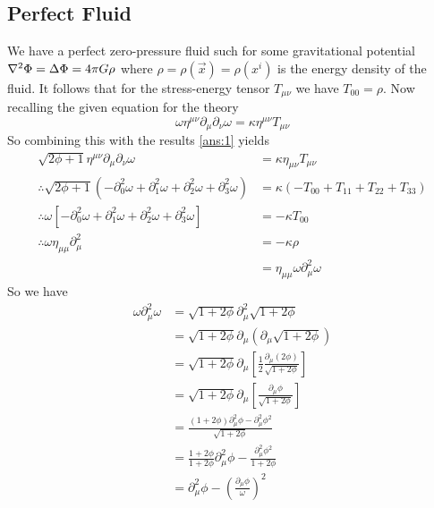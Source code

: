 \documentclass{article}
\begin{document}
	\subsection{Perfect Fluid}
	We have a perfect zero-pressure fluid such for some gravitational potential $\nabla^2 \Phi = \Delta \Phi = 4\pi G\rho$ where $\rho = \rho(\vec{x}) = \rho(x^i)$ is the energy density of the fluid. It follows that for the stress-energy tensor $T_{\mu\nu}$ we have $T_00 = \rho$. Now recalling the given equation for the theory
	\begin{equation}
		\label{eq:theory}
		\omega \eta^{\mu\nu} \partial_\mu \partial_\nu \omega = \kappa \eta^{\mu\nu} T_{\mu\nu}
	\end{equation}
	So combining this with the results \ref{ans:1} yields
	\begin{align*}
		\sqrt{2 \phi + 1} \eta^{\mu\nu} \partial_\mu \partial_\nu \omega &= \kappa \eta_{\mu\nu} T_{\mu\nu} \\
		\therefore \sqrt{2 \phi + 1} \left( - \partial_0^2 \omega + \partial_1^2 \omega + \partial_2^2 \omega + \partial_3^2 \omega \right) &= \kappa \left( - T_{00} + T_{11} + T_{22} + T_{33} \right) \\
		\therefore \omega \left[ -\partial_0^2 \omega + \partial_1^2 \omega + \partial_2^2 \omega + \partial_3^2 \omega \right] &= - \kappa T_{00} \\
		\therefore \omega \eta_{\mu\mu} \partial_\mu^2 &= -\kappa \rho \\
		 &= \eta_{\mu\mu} \omega \partial_\mu^2 \omega
	\end{align*}
	So we have 
	\begin{align*}
		\omega \partial_\mu^2 \omega &= \sqrt{1+2\phi} \partial_\mu^2 \sqrt{1+2\phi} \\
		&= \sqrt{1+2\phi} \partial_\mu \left( \partial_\mu \sqrt{1+2\phi}\right) \\
		&= \sqrt{1+2\phi} \partial_\mu \left[ \frac12 \frac{\partial_\mu \left(2\phi\right)}{\sqrt{1+2\phi}}\right] \\
		&= \sqrt{1+2\phi} \partial_\mu \left[  \frac{\partial_\mu \phi}{\sqrt{1+2\phi}}\right] \\
		&= \frac{(1+2\phi)\partial_\mu^2 \phi - \partial_\mu^2 \phi^2}{\sqrt{1 + 2\phi}} \\
		&= \frac{1+2\phi}{1+2\phi} \partial_\mu^2 \phi - \frac{\partial_\mu^2 \phi^2}{1+2\phi} \\
		&= \partial_\mu^2 \phi - \left( \frac{\partial_\mu \phi}{\omega}\right)^2 
	\end{align*}
\end{document}
